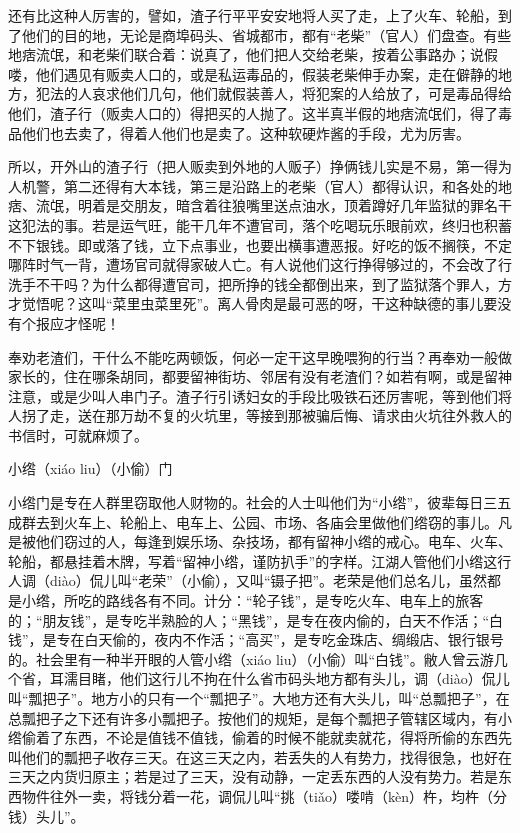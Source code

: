 \documentclass[12pt,UTF8]{ctexbook}
\begin{document}
还有比这种人厉害的，譬如，渣子行平平安安地将人买了走，上了火车、轮船，到了他们的目的地，无论是商埠码头、省城都市，都有“老柴”（官人）们盘查。有些地痞流氓，和老柴们联合着：说真了，他们把人交给老柴，按着公事路办；说假喽，他们遇见有贩卖人口的，或是私运毒品的，假装老柴伸手办案，走在僻静的地方，犯法的人哀求他们几句，他们就假装善人，将犯案的人给放了，可是毒品得给他们，渣子行（贩卖人口的）得把买的人抛了。这半真半假的地痞流氓们，得了毒品他们也去卖了，得着人他们也是卖了。这种软硬炸酱的手段，尤为厉害。

所以，开外山的渣子行（把人贩卖到外地的人贩子）挣俩钱儿实是不易，第一得为人机警，第二还得有大本钱，第三是沿路上的老柴（官人）都得认识，和各处的地痞、流氓，明着是交朋友，暗含着往狼嘴里送点油水，顶着蹲好几年监狱的罪名干这犯法的事。若是运气旺，能干几年不遭官司，落个吃喝玩乐眼前欢，终归也积蓄不下银钱。即或落了钱，立下点事业，也要出横事遭恶报。好吃的饭不搁筷，不定哪阵时气一背，遭场官司就得家破人亡。有人说他们这行挣得够过的，不会改了行洗手不干吗？为什么都得遭官司，把所挣的钱全都倒出来，到了监狱落个罪人，方才觉悟呢？这叫“菜里虫菜里死”。离人骨肉是最可恶的呀，干这种缺德的事儿要没有个报应才怪呢！

奉劝老渣们，干什么不能吃两顿饭，何必一定干这早晚喂狗的行当？再奉劝一般做家长的，住在哪条胡同，都要留神街坊、邻居有没有老渣们？如若有啊，或是留神注意，或是少叫人串门子。渣子行引诱妇女的手段比吸铁石还厉害呢，等到他们将人拐了走，送在那万劫不复的火坑里，等接到那被骗后悔、请求由火坑往外救人的书信时，可就麻烦了。





小绺（xiáo liu）（小偷）门


小绺门是专在人群里窃取他人财物的。社会的人士叫他们为“小绺”，彼辈每日三五成群去到火车上、轮船上、电车上、公园、市场、各庙会里做他们绺窃的事儿。凡是被他们窃过的人，每逢到娱乐场、杂技场，都有留神小绺的戒心。电车、火车、轮船，都悬挂着木牌，写着“留神小绺，谨防扒手”的字样。江湖人管他们小绺这行人调（diào）侃儿叫“老荣”（小偷），又叫“镊子把”。老荣是他们总名儿，虽然都是小绺，所吃的路线各有不同。计分：“轮子钱”，是专吃火车、电车上的旅客的；“朋友钱”，是专吃半熟脸的人；“黑钱”，是专在夜内偷的，白天不作活；“白钱”，是专在白天偷的，夜内不作活；“高买”，是专吃金珠店、绸缎店、银行银号的。社会里有一种半开眼的人管小绺（xiáo liu）（小偷）叫“白钱”。敝人曾云游几个省，耳濡目睹，他们这行儿不拘在什么省市码头地方都有头儿，调（diào）侃儿叫“瓢把子”。地方小的只有一个“瓢把子”。大地方还有大头儿，叫“总瓢把子”，在总瓢把子之下还有许多小瓢把子。按他们的规矩，是每个瓢把子管辖区域内，有小绺偷着了东西，不论是值钱不值钱，偷着的时候不能就卖就花，得将所偷的东西先叫他们的瓢把子收存三天。在这三天之内，若丢失的人有势力，找得很急，也好在三天之内货归原主；若是过了三天，没有动静，一定丢东西的人没有势力。若是东西物件往外一卖，将钱分着一花，调侃儿叫“挑（tiǎo）喽啃（kèn）杵，均杵（分钱）头儿”。
\end{document}
